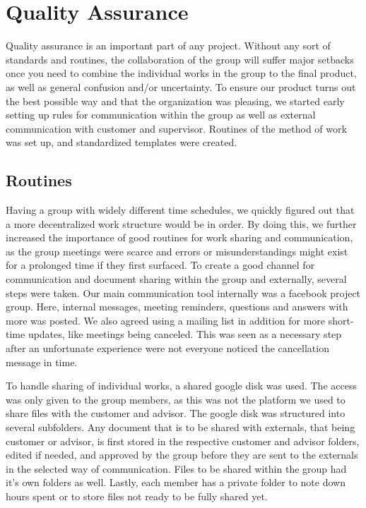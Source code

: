 \documentclass[11pt]{book}
\begin{document}
\section{Quality Assurance}
Quality assurance is an important part of any project. Without any sort of standards and routines, the collaboration of the group will suffer major setbacks once you need to combine the individual works in the group to the final product, as well as general confusion and/or uncertainty. To ensure our product turns out the best possible way and that the organization was pleasing, we started early setting up rules for communication within the group as well as external communication with customer and supervisor. Routines of the method of work was set up, and standardized templates were created.

\subsection{Routines}
Having a group with widely different time schedules, we quickly figured out that a more decentralized work structure would be in order. By doing this, we further increased the importance of good routines for work sharing and communication, as the group meetings were scarce and errors or misunderstandings might exist for a prolonged time if they first surfaced.
To create a good channel for communication and document sharing within the group and externally, several steps were taken. Our main communication tool internally was a facebook project group. Here, internal messages, meeting reminders, questions and answers with more was posted. We also agreed using a mailing list in addition for more short-time updates, like meetings being canceled. This was seen as a necessary step after an unfortunate experience were not everyone noticed the cancellation message in time.

To handle sharing of individual works, a shared google disk was used. The access was only given to the group members, as this was not the platform we used to share files with the customer and advisor. The google disk was structured into several subfolders. Any document that is to be shared with externals, that being customer or advisor, is first stored in the respective customer and advisor folders, edited if needed, and approved by the group before they are sent to the externals in the selected way of communication. Files to be shared within the group had it's own folders as well. Lastly, each member has a private folder to note down hours spent or to store files not ready to be fully shared yet.
\end{document}
